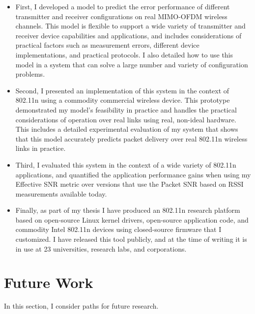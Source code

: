 \begin{itemize}
\item First, I developed a model to predict the error performance of different transmitter and receiver configurations on real MIMO-OFDM wireless channels. This model is flexible to support a wide variety of transmitter and receiver device capabilities and applications, and includes considerations of practical factors such as measurement errors, different device implementations, and practical protocols. I also detailed how to use this model in a system that can solve a large number and variety of configuration problems.
\item Second, I presented an implementation of this system in the context of 802.11n using a commodity commercial wireless device. This prototype demonstrated my model's feasibility in practice and handles the practical considerations of operation over real links using real, non-ideal hardware. This includes a detailed experimental evaluation of my system that shows that this model accurately predicts packet delivery over real 802.11n wireless links in practice.
\item Third, I evaluated this system in the context of a wide variety of 802.11n applications, and quantified the application performance gains when using my Effective SNR metric over versions that use the Packet SNR based on RSSI measurements available today.
\item Finally, as part of my thesis I have produced an 802.11n research platform based on open-source Linux kernel drivers, open-source application code, and commodity Intel 802.11n devices using closed-source firmware that I customized.
I have released this tool publicly, and at the time of writing it is in use at 23 universities, research labs, and corporations.
\end{itemize}

\section{Future Work}
In this section, I consider paths for future research.

